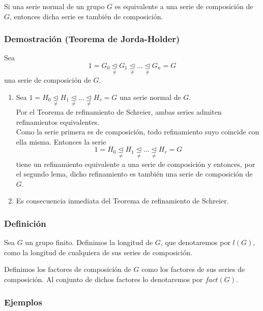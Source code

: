 \documentclass[11pt,a4paper]{article}
\begin{document}
Si una serie normal de un grupo $G$ es equivalente a una serie de composición de $G$, entonces dicha serie es también de composición.

\subsubsection*{Demostración (Teorema de Jorda-Holder)}

Sea
$$1 = G_{0} \underset{\neq}{\unlhd} G_{1} \underset{\neq}{\unlhd} ... \underset{\neq}{\unlhd} G_{n} = G$$
una serie de composición de $G$.

\begin{enumerate}[label = \alph*)]
\item Sea $1 = H_{0} \underset{\neq}{\unlhd} H_{1} \underset{\neq}{\unlhd} ... \underset{\neq}{\unlhd} H_{r} = G$ una serie normal de $G$. \\
Por el Teorema de refinamiento de Schreier, ambas series admiten refinamientos equivalentes. \\
Como la serie primera es de composición, todo refinamiento suyo coincide con ella misma. Entonces la serie
$$1 = H_{0} \underset{\neq}{\unlhd} H_{1} \underset{\neq}{\unlhd} ... \underset{\neq}{\unlhd} H_{r} = G$$
tiene un refinamiento equivalente a una serie de composición y entonces, por el segundo lema, dicho refinamiento es también una serie de composición de $G$.
\item Es consecuencia inmediata del Teorema de refinamiento de Schreier.
\end{enumerate}

\subsubsection*{Definición}

Sea $G$ un grupo finito. Definimos la longitud de $G$, que denotaremos por $l(G)$, como la longitud de cualquiera de sus series de composición.

Definimos los factores de composición de $G$ como los factores de sus series de composición. Al conjunto de dichos factores lo denotaremos por $fact(G)$.

\subsubsection*{Ejemplos}
\end{document}
